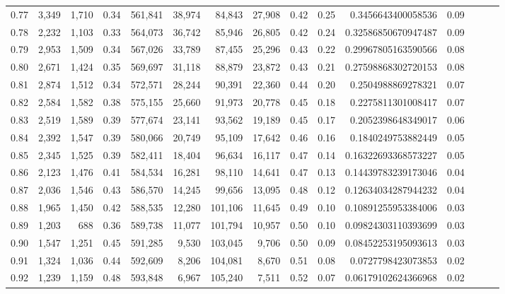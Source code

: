 \begin{tabular}{rrrrrrrrrrrrrrr}
0.77 &   3,349 &  1,710 &  0.34 &  561,841 &   38,974 &   84,843 &   27,908 &  0.42 &  0.25 &    0.3456643400058536 &      0.09 \\
0.78 &   2,232 &  1,103 &  0.33 &  564,073 &   36,742 &   85,946 &   26,805 &  0.42 &  0.24 &   0.32586850670947487 &      0.09 \\
0.79 &   2,953 &  1,509 &  0.34 &  567,026 &   33,789 &   87,455 &   25,296 &  0.43 &  0.22 &   0.29967805163590566 &      0.08 \\
0.80 &   2,671 &  1,424 &  0.35 &  569,697 &   31,118 &   88,879 &   23,872 &  0.43 &  0.21 &   0.27598868302720153 &      0.08 \\
0.81 &   2,874 &  1,512 &  0.34 &  572,571 &   28,244 &   90,391 &   22,360 &  0.44 &  0.20 &    0.2504988869278321 &      0.07 \\
0.82 &   2,584 &  1,582 &  0.38 &  575,155 &   25,660 &   91,973 &   20,778 &  0.45 &  0.18 &    0.2275811301008417 &      0.07 \\
0.83 &   2,519 &  1,589 &  0.39 &  577,674 &   23,141 &   93,562 &   19,189 &  0.45 &  0.17 &    0.2052398648349017 &      0.06 \\
0.84 &   2,392 &  1,547 &  0.39 &  580,066 &   20,749 &   95,109 &   17,642 &  0.46 &  0.16 &    0.1840249753882449 &      0.05 \\
0.85 &   2,345 &  1,525 &  0.39 &  582,411 &   18,404 &   96,634 &   16,117 &  0.47 &  0.14 &   0.16322693368573227 &      0.05 \\
0.86 &   2,123 &  1,476 &  0.41 &  584,534 &   16,281 &   98,110 &   14,641 &  0.47 &  0.13 &   0.14439783239173046 &      0.04 \\
0.87 &   2,036 &  1,546 &  0.43 &  586,570 &   14,245 &   99,656 &   13,095 &  0.48 &  0.12 &   0.12634034287944232 &      0.04 \\
0.88 &   1,965 &  1,450 &  0.42 &  588,535 &   12,280 &  101,106 &   11,645 &  0.49 &  0.10 &   0.10891255953384006 &      0.03 \\
0.89 &   1,203 &    688 &  0.36 &  589,738 &   11,077 &  101,794 &   10,957 &  0.50 &  0.10 &   0.09824303110393699 &      0.03 \\
0.90 &   1,547 &  1,251 &  0.45 &  591,285 &    9,530 &  103,045 &    9,706 &  0.50 &  0.09 &   0.08452253195093613 &      0.03 \\
0.91 &   1,324 &  1,036 &  0.44 &  592,609 &    8,206 &  104,081 &    8,670 &  0.51 &  0.08 &    0.0727798423073853 &      0.02 \\
0.92 &   1,239 &  1,159 &  0.48 &  593,848 &    6,967 &  105,240 &    7,511 &  0.52 &  0.07 &   0.06179102624366968 &      0.02 \\

\end{tabular}
